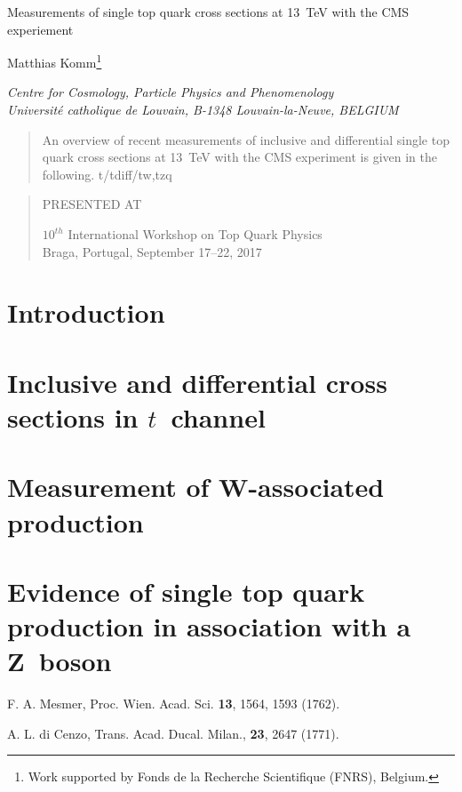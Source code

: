 \documentclass[12pt]{article}
\newcommand\pubnumber{}
\newcommand\pubdate{\today}
\def\institute{Centre for Cosmology, Particle Physics and Phenomenology\\
Universit\'e catholique de Louvain, B-1348 Louvain-la-Neuve, BELGIUM}
\def\support{\footnote{Work supported by Fonds de la Recherche Scientifique (FNRS), Belgium.}}
\def\Title#1{\begin{center} {\Large #1 } \end{center}}
\def\Author#1{\begin{center}{ \sc #1} \end{center}}
\def\Address#1{\begin{center}{ \it #1} \end{center}}
\newcommand\pubblock{\rightline{\begin{tabular}{l} \pubnumber\\
         \pubdate  \end{tabular}}}
\newenvironment{Abstract}{\begin{quotation}  }{\end{quotation}}
\newenvironment{Presented}{\begin{quotation} \begin{center} 
             PRESENTED AT\end{center}\bigskip 
      \begin{center}\begin{large}}{\end{large}\end{center} \end{quotation}}
\begin{document}
\begin{titlepage}
\pubblock

\vfill
\Title{Measurements of single top quark cross sections at 13~TeV with the CMS experiement}
\vfill
\Author{Matthias Komm\support}
\Address{\institute}
\vfill
\begin{Abstract}
An overview of recent measurements of inclusive and differential single top quark cross sections at 13~TeV with the CMS experiment is given in the following. t/tdiff/tw,tzq
\end{Abstract}
\vfill
\begin{Presented}
$10^{th}$ International Workshop on Top Quark Physics\\
Braga, Portugal,  September 17--22, 2017
\end{Presented}
\vfill
\end{titlepage}
\def\thefootnote{\fnsymbol{footnote}}
\setcounter{footnote}{0}
%

\section{Introduction}


\section{Inclusive and differential cross sections in $t$~channel}

\section{Measurement of W-associated production}

\section{Evidence of single top quark production in association with a Z~boson}


\begin{thebibliography}{99}


F. A. Mesmer, Proc. Wien. Acad. Sci. {\bf 13}, 1564, 1593 (1762).


A. L. di Cenzo, Trans. Acad. Ducal.  Milan., {\bf 23}, 2647 (1771).

\end{thebibliography}

 
\end{document}
